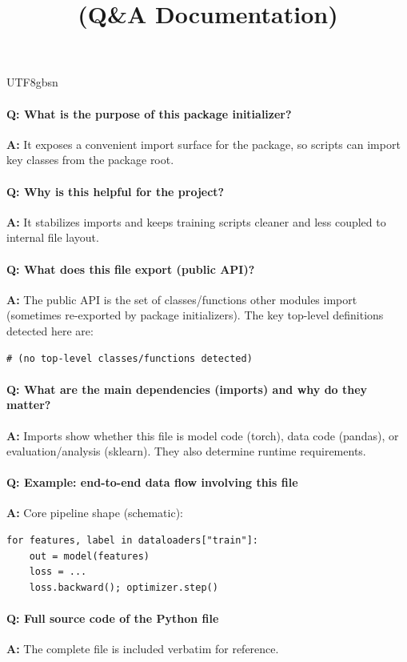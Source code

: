 \documentclass[11pt]{article}
\title{\texttt{\detokenize{model/__init__.py}} (Q\&A Documentation)}
\author{}
\date{}
\begin{document}
\begin{CJK*}{UTF8}{gbsn}
\maketitle

\paragraph{Q: What is the purpose of this package initializer?}
\textbf{A:} It exposes a convenient import surface for the package, so scripts can import key classes from the package root.

\paragraph{Q: Why is this helpful for the project?}
\textbf{A:} It stabilizes imports and keeps training scripts cleaner and less coupled to internal file layout.

\paragraph{Q: What does this file export (public API)?}
\textbf{A:} The public API is the set of classes/functions other modules import (sometimes re-exported by package initializers). The key top-level definitions detected here are:

\begin{Verbatim}[fontsize=\small]
# (no top-level classes/functions detected)
\end{Verbatim}

\paragraph{Q: What are the main dependencies (imports) and why do they matter?}
\textbf{A:} Imports show whether this file is model code (torch), data code (pandas), or evaluation/analysis (sklearn). They also determine runtime requirements.

\vspace{1mm}


\paragraph{Q: Example: end-to-end data flow involving this file}
\textbf{A:} Core pipeline shape (schematic):

\begin{Verbatim}[fontsize=\small]
for features, label in dataloaders["train"]:
    out = model(features)
    loss = ...
    loss.backward(); optimizer.step()
\end{Verbatim}

\paragraph{Q: Full source code of the Python file}
\textbf{A:} The complete file is included verbatim for reference.


\end{CJK*}
\end{document}

